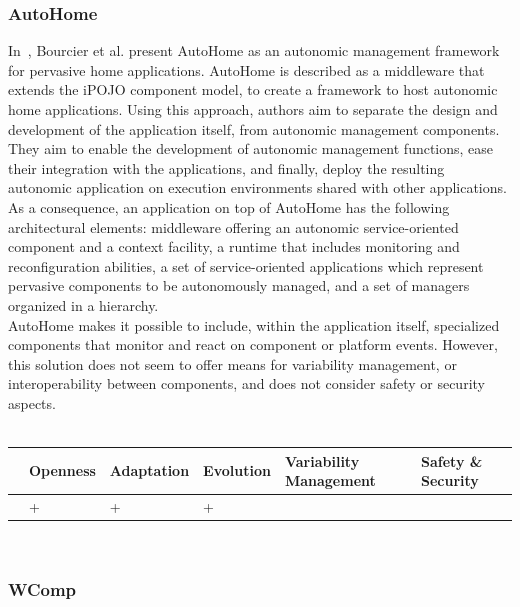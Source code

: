\subsubsection{AutoHome}

In~\cite{Bourcier:2011}, Bourcier et al. present AutoHome as an autonomic management framework for pervasive home applications. AutoHome is described as a middleware that extends the iPOJO component model, to create a framework to host autonomic home applications. Using this approach, authors aim to separate the design and development of the application itself, from autonomic management components. They aim to enable the development of autonomic management functions, ease their integration with the applications, and finally, deploy the resulting autonomic application on execution environments shared with other applications. As a consequence, an application on top of AutoHome has the following architectural elements: middleware offering an autonomic service-oriented component and a context facility, a runtime that includes monitoring and reconfiguration abilities, a set of service-oriented applications which represent pervasive components to be autonomously managed, and a set of managers organized in a hierarchy.\\

AutoHome makes it possible to include, within the application itself, specialized components that monitor and react on component or platform events.
However, this solution does not seem to offer means for variability management, or interoperability between components, and does not consider safety or security aspects.\\
 \\
\begin{tabular}{ >{\centering}m{}| >{\centering}m{} >{\centering}m{}| >{\centering}m{} >{\centering}m{}| >{\centering\arraybackslash}m{}}
{\tiny Interoperability} & {\tiny Openness} & {\tiny Adaptation} & {\tiny Evolution} & {\tiny Variability Management} & {\tiny Safety \& Security}\\
 \hline
  & + & + & + &  & \\ 
  \hline
\end{tabular}\\


\subsubsection{WComp}

